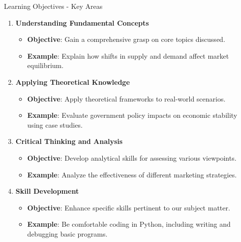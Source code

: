 \documentclass[aspectratio=169]{beamer}
\begin{document}
\begin{frame}[fragile]{Learning Objectives - Key Areas}
    \begin{enumerate}
        \item \textbf{Understanding Fundamental Concepts}  
            \begin{itemize}
                \item \textbf{Objective}: Gain a comprehensive grasp on core topics discussed.
                \item \textbf{Example}: Explain how shifts in supply and demand affect market equilibrium.
            \end{itemize}
        
        \item \textbf{Applying Theoretical Knowledge}  
            \begin{itemize}
                \item \textbf{Objective}: Apply theoretical frameworks to real-world scenarios.
                \item \textbf{Example}: Evaluate government policy impacts on economic stability using case studies.
            \end{itemize}

        \item \textbf{Critical Thinking and Analysis}  
            \begin{itemize}
                \item \textbf{Objective}: Develop analytical skills for assessing various viewpoints.
                \item \textbf{Example}: Analyze the effectiveness of different marketing strategies.
            \end{itemize}

        \item \textbf{Skill Development}  
            \begin{itemize}
                \item \textbf{Objective}: Enhance specific skills pertinent to our subject matter.
                \item \textbf{Example}: Be comfortable coding in Python, including writing and debugging basic programs.
            \end{itemize}
    \end{enumerate}
\end{frame}
\end{document}

